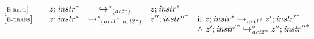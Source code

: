 $$
\begin{array}[t]{@{}lrcl@{}l@{}}
{[\textsc{\scriptsize E{-}refl}]} \quad & z ; {{\mathit{instr}}^\ast} & {\hookrightarrow^\ast}_{({{\mathit{act}}^\ast})} {} & z ; {{\mathit{instr}}^\ast} \\
{[\textsc{\scriptsize E{-}trans}]} \quad & z ; {{\mathit{instr}}^\ast} & {\hookrightarrow^\ast}_{({{\mathit{act{\kern-0.1em\scriptstyle 1}}}^?}~{{\mathit{act{\kern-0.1em\scriptstyle 2}}}^\ast})} {} & {z''} ; {{\mathit{instr}''}^\ast} & \quad
\begin{array}[t]{@{}l@{}}
\mbox{if}~ z ; {{\mathit{instr}}^\ast} \hookrightarrow_{{{\mathit{act{\kern-0.1em\scriptstyle 1}}}^?}} {z'} ; {{\mathit{instr}'}^\ast} \\
{\land}~ {z'} ; {{\mathit{instr}'}^\ast} \hookrightarrow^\ast_{{{\mathit{act{\kern-0.1em\scriptstyle 2}}}^\ast}} {z''} ; {{\mathit{instr}''}^\ast} \\
\end{array} \\
\end{array}
$$

\vspace{1ex}

